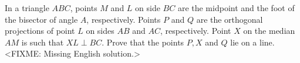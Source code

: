 \problem
In a triangle $ABC$, points $M$ and $L$ on side $BC$ are the midpoint and the
foot of the bisector of angle $A$, respectively.
Points $P$ and $Q$ are the orthogonal projections of point $L$ on sides $AB$
and $AC$, respectively.
Point $X$ on the median $AM$ is such that $XL \perp BC$.
Prove that the points $P,X$ and $Q$ lie on a line.
\solution
<FIXME: Missing English solution.>
\endproblem
